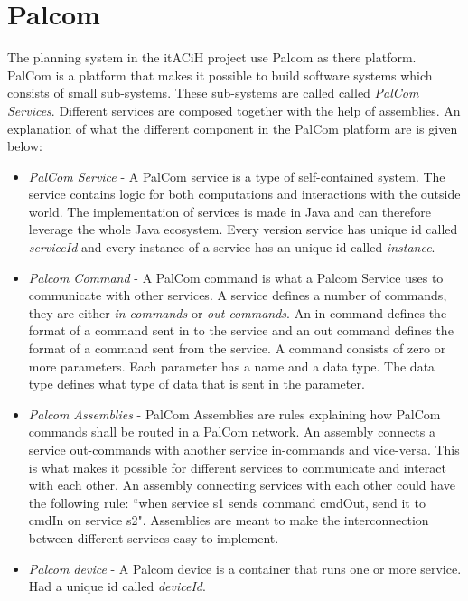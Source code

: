 \documentclass{cslthse-msc}
\begin{document}
\section{Palcom}
The planning system in the itACiH project use Palcom as there platform. PalCom is a platform that makes it possible to build software systems which consists of small sub-systems\cite{ist-PalCom}. These sub-systems are called called \emph{PalCom Services}. Different services are composed together with the help of assemblies. An explanation of what the different component in the PalCom platform are is given below: 

\begin{itemize}
\item \emph{PalCom Service} - A PalCom service is a type of self-contained system. The service contains logic for both computations and interactions with the outside world. The implementation of services is made in Java and can therefore leverage the whole Java ecosystem. Every version service has unique id called \emph{serviceId} and every instance of a service has an unique id called \emph{instance}. 


\item \emph{Palcom Command} - A PalCom command is what a Palcom Service uses to communicate with other services. A service defines a number of commands, they are either \emph{in-commands} or \emph{out-commands}. An in-command defines the format of a command sent in to the service and an out command defines the format of a command sent from the service. A command consists of zero or more parameters. Each parameter has a name and a data type. The data type defines what type of data that is sent in the parameter. 

\item \emph{Palcom Assemblies} - PalCom Assemblies are rules explaining how PalCom commands shall be routed in a PalCom network. An assembly connects a service out-commands with another service in-commands and vice-versa. This is what makes it possible for different services to communicate and interact with each other. An assembly connecting services with each other could have the following rule:  “when service s1 sends command cmdOut, send it to cmdIn on service s2". Assemblies are meant to make the interconnection between different services easy to implement.

\item \emph{Palcom device} - A Palcom device is a container that runs one or more service. Had a unique id called \emph{deviceId}.
\end{itemize}
\end{document}
